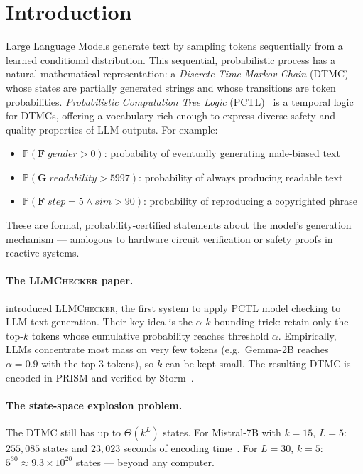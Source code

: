 \documentclass{article}
\newcommand{\Prob}{\mathbb{P}}
\begin{document}
\section{Introduction}
\label{sec:intro}

Large Language Models generate text by sampling tokens sequentially from a
learned conditional distribution.
This sequential, probabilistic process has a natural mathematical
representation: a \emph{Discrete-Time Markov Chain} (DTMC) whose states are
partially generated strings and whose transitions are token probabilities.
\emph{Probabilistic Computation Tree Logic} (PCTL)~\citep{hansson1994logic,baier2008principles}
is a temporal logic for DTMCs, offering a vocabulary rich enough to express
diverse safety and quality properties of LLM outputs. For example:
\begin{itemize}[leftmargin=*,itemsep=1pt,topsep=2pt]
  \item $\Prob(\mathbf{F}\;\textit{gender}{>}0)$: probability of eventually
        generating male-biased text
  \item $\Prob(\mathbf{G}\;\textit{readability}{>}5997)$: probability of
        always producing readable text
  \item $\Prob(\mathbf{F}\;\textit{step}{=}5 \wedge \textit{sim}{>}90)$:
        probability of reproducing a copyrighted phrase
\end{itemize}
These are formal, probability-certified statements about the model's generation
mechanism — analogous to hardware circuit verification or safety proofs in
reactive systems.

\paragraph{The \textsc{LLMChecker} paper.}
\citet{gross2025llmchecker} introduced \textsc{LLMChecker}, the first system to
apply PCTL model checking to LLM text generation.
Their key idea is the $\alpha$-$k$ bounding trick: retain only the top-$k$
tokens whose cumulative probability reaches threshold $\alpha$.
Empirically, LLMs concentrate most mass on very few tokens (e.g.\ Gemma-2B
reaches $\alpha{=}0.9$ with the top 3 tokens), so $k$ can be kept small.
The resulting DTMC is encoded in PRISM and verified by
Storm~\citep{hensel2022storm}.

\paragraph{The state-space explosion problem.}
The DTMC still has up to $\Theta(k^L)$ states.
For Mistral-7B with $k{=}15$, $L{=}5$: $255{,}085$ states and $23{,}023$
seconds of encoding time~\citep{gross2025llmchecker}.
For $L{=}30$, $k{=}5$: $5^{30} \approx 9.3 \times 10^{20}$ states — beyond
any computer.
\end{document}
